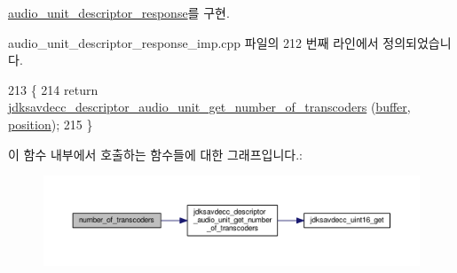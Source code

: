 \hyperlink{classavdecc__lib_1_1audio__unit__descriptor__response_a55670f24cb0eef2234ebd0629e4fb503}{audio\+\_\+unit\+\_\+descriptor\+\_\+response}를 구현.



audio\+\_\+unit\+\_\+descriptor\+\_\+response\+\_\+imp.\+cpp 파일의 212 번째 라인에서 정의되었습니다.


\begin{DoxyCode}
213 \{
214     \textcolor{keywordflow}{return} \hyperlink{group__descriptor__audio_gaf4f033db7a41cd05cc30c3227d5ee48c}{jdksavdecc\_descriptor\_audio\_unit\_get\_number\_of\_transcoders}
      (\hyperlink{classavdecc__lib_1_1descriptor__response__base__imp_a56ed84df35de10bdb65e72b184309497}{buffer}, \hyperlink{classavdecc__lib_1_1descriptor__response__base__imp_a7a04afe5347934be732ec70a70bd0a28}{position});
215 \}
\end{DoxyCode}


이 함수 내부에서 호출하는 함수들에 대한 그래프입니다.\+:
\nopagebreak
\begin{figure}[H]
\begin{center}
\leavevmode
\includegraphics[width=350pt]{classavdecc__lib_1_1audio__unit__descriptor__response__imp_afdc1ba3d5f109525cae00afe151e76e3_cgraph}
\end{center}
\end{figure}


